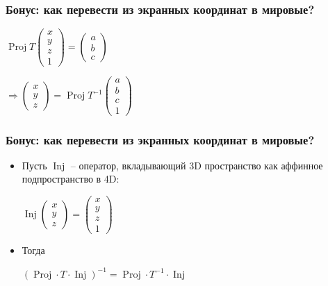 \documentclass[10pt]{beamer}
\begin{document}
\begin{frame}[fragile]
\frametitle{Бонус: как перевести из экранных координат в мировые?}
\begin{center}
\begin{math}
\operatorname{Proj} T \begin{pmatrix}x \\ y \\ z \\ 1\end{pmatrix} =
\begin{pmatrix}a \\ b \\ c\end{pmatrix}
\end{math}
\end{center}
\begin{center}
\begin{math}
\Longrightarrow \begin{pmatrix}x \\ y \\ z\end{pmatrix} =
\operatorname{Proj} T^{-1} \begin{pmatrix}a \\ b \\ c \\ 1\end{pmatrix}
\end{math}
\end{center}
\end{frame}

\begin{frame}[fragile]
\frametitle{Бонус: как перевести из экранных координат в мировые?}
\begin{itemize}
\item Пусть \begin{math}\operatorname{Inj}\end{math} -- оператор, вкладывающий 3D пространство как аффинное подпространство в 4D:
\begin{center}
\begin{math}
\operatorname{Inj}\begin{pmatrix}x \\ y \\ z\end{pmatrix} = \begin{pmatrix}x \\ y \\ z \\ 1\end{pmatrix}
\end{math}
\end{center}
\item Тогда
\begin{center}
\begin{math}
\left(\operatorname{Proj} \cdot T \cdot \operatorname{Inj}\right)^{-1} = \operatorname{Proj} \cdot T^{-1} \cdot \operatorname{Inj}
\end{math}
\end{center}
\end{itemize}
\end{frame}
\end{document}

